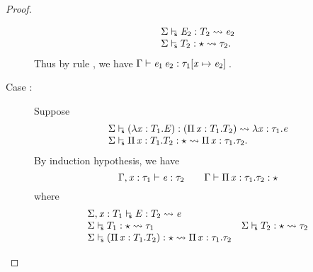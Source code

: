 \begin{proof}
\begin{description}
\[\begin{array}{l}
               \Sigma  \vdash_{\!\!\mathsf{s} }  \mathit{E_{{\mathrm{2}}}}  :  T_{{\mathrm{2}}}   \rightsquigarrow   \mathit{e_{{\mathrm{2}}}}  \\
               \Sigma  \vdash_{\!\!\mathsf{s} }  T_{{\mathrm{2}}}  :  \star   \rightsquigarrow   \tau_{{\mathrm{2}}} .
            \end{array}\] Thus by rule , we have $\Gamma  \vdash  \mathit{e_{{\mathrm{1}}}} \, \mathit{e_{{\mathrm{2}}}}  :  \tau_{{\mathrm{1}}}  [  \mathit{x}  \mapsto  \mathit{e_{{\mathrm{2}}}}  ] \,$.
        \item[Case \ruleref{TR\_Lam}:] Suppose
            \[\begin{array}{l}
             \Sigma  \vdash_{\!\!\mathsf{s} }  (  \lambda  \mathit{x}  :  T_{{\mathrm{1}}}  .  \mathit{E}  )  :  (  \Pi \, \mathit{x}  :  T_{{\mathrm{1}}}  .  T_{{\mathrm{2}}}  )   \rightsquigarrow   \lambda  \mathit{x}  :  \tau_{{\mathrm{1}}}  .  \mathit{e}  \\ 
             \Sigma  \vdash_{\!\!\mathsf{s} }  \Pi \, \mathit{x}  :  T_{{\mathrm{1}}}  .  T_{{\mathrm{2}}}  :  \star   \rightsquigarrow   \Pi \, \mathit{x}  :  \tau_{{\mathrm{1}}}  .  \tau_{{\mathrm{2}}} .
            \end{array} \]
            By induction hypothesis, we have 
            \[
            \Gamma  ,  \mathit{x}  :  \tau_{{\mathrm{1}}}  \vdash  \mathit{e}  :  \tau_{{\mathrm{2}}}\qquad
            \Gamma  \vdash  \Pi \, \mathit{x}  :  \tau_{{\mathrm{1}}}  .  \tau_{{\mathrm{2}}}  :  \star
            \]
            where 
            \[
            \begin{array}{ll}
             \Sigma  \ottsym{,}  \ottmv{x}  \ottsym{:}  T_{{\mathrm{1}}}  \labeledjudge{s}  \ottnt{E}  :  T_{{\mathrm{2}}}   \rightsquigarrow   \ottnt{e}  & \\
             \Sigma  \labeledjudge{s}  T_{{\mathrm{1}}}  :  \star   \rightsquigarrow   \tau_{{\mathrm{1}}}  &  \Sigma  \labeledjudge{s}  T_{{\mathrm{2}}}  :  \star   \rightsquigarrow   \tau_{{\mathrm{2}}}  \\
             \Sigma  \labeledjudge{s}  \ottsym{(}  \Pi \, \ottmv{x}  \ottsym{:}  T_{{\mathrm{1}}}  \ottsym{.}  T_{{\mathrm{2}}}  \ottsym{)}  :  \star   \rightsquigarrow   \Pi \, \ottmv{x}  \ottsym{:}  \tau_{{\mathrm{1}}}  \ottsym{.}  \tau_{{\mathrm{2}}}  &
            \end{array}
\]
\end{description}
\end{proof}
